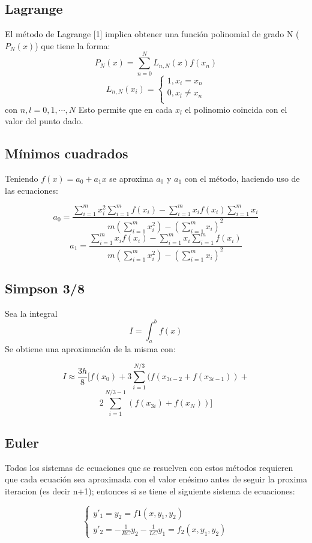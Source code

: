 \documentclass[letterpaper, 10 pt, conference]{ieeeconf}  %
\begin{document}
\subsection{Lagrange}

El m\'etodo de Lagrange [1] implica obtener una funci\'on polinomial de grado N ($P_N(x)$) que tiene la forma:
\[ P_N(x) = \sum_{n=0}^{N}L_{n,N}(x)f(x_n) \]
\[ L_{n,N}(x_{i}) = \begin{cases} 1, x_{i} = x_{n} \\ 0, x_{l} \neq x_{n} \\  \end{cases} \]
con $ n,l = 0,1,\cdots,N $
Esto permite que en cada $x_{l}$ el polinomio coincida con el valor del punto dado.

\subsection{M\'inimos cuadrados}

Teniendo $f(x) = a_{0} + a_{1}x$ se aproxima $a_{0}$ y $a_{1}$ con el m\'etodo, haciendo uso de las ecuaciones:

\[ a_{0} = \frac{\sum_{i=1}^{m}x_{i}^{2}\sum_{i=1}^{m}f(x_{i})-\sum_{i=1}^{m}x_{i}f(x_{i})\sum_{i=1}^{m}x_{i}}{m(\sum_{i=1}^{m}x_{i}^{2})-(\sum_{i=1}^{m}x_{i})^{2}} \]
\[ a_{1} = \frac{\sum_{i=1}^{m}x_{i}f(x_{i})-\sum_{i=1}^{m}x_{i}\sum_{i=1}^{m}f(x_{i})}{m(\sum_{i=1}^{m}x_{i}^{2})-(\sum_{i=1}^{m}x_{i})^{2}} \]

\subsection{Simpson 3/8}

Sea la integral
\[ I = \int_{a}^{b}f(x) \]
Se obtiene una aproximaci\'on de la misma con:

\[ I \approx \frac{3h}{8}[f(x_{0}) + 3\sum_{i=1}^{N/3}(f(x_{3i-2} + f(x_{3i-1})) + \]
\[ 2\sum_{i=1}^{N/3-1}(f(x_{3i}) + f(x_{N}))] \]


\subsection{Euler}
   
Todos los sistemas de ecuaciones que se resuelven con estos m\'etodos requieren que cada ecuaci\'on sea aproximada con el valor en\'esimo antes de seguir la proxima iteracion (es decir n+1); entonces si se tiene el siguiente sistema de ecuaciones:

\[ \begin{cases} y'_1 = y_2 = f1(x, y_1, y_2) \\ y'_2 = - \frac{1}{RC} y_2 - \frac{1}{LC} y_1 = f_2(x, y_1, y_2) \end{cases} \]
\end{document}
